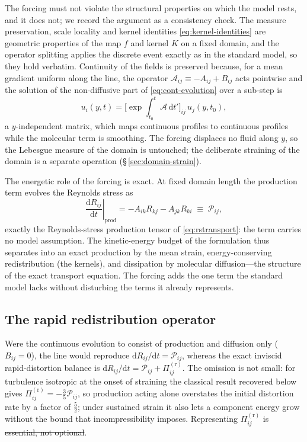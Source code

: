 \documentclass[lineno]{JFM-FLM_Au}
\newcounter{assumption}
\providecommand{\DIFadd}[1]{{\protect\color{blue}\uwave{#1}}} %
\providecommand{\DIFdel}[1]{{\protect\color{red}\sout{#1}}} %
\providecommand{\DIFaddbegin}{} %
\providecommand{\DIFaddend}{} %
\providecommand{\DIFdelbegin}{} %
\providecommand{\DIFdelend}{} %
\begin{document}
The forcing must not violate the structural properties on which the
model rests, and it does not; we record the argument as a consistency
check. The measure preservation, scale locality and kernel identities
\eqref{eq:kernel-identities} are geometric properties of the map $f$ and
kernel $K$ on a fixed domain, and the operator splitting applies the
discrete event exactly as in the standard model, so they hold verbatim.
Continuity of the fields is preserved because, for a mean gradient
uniform along the line, the operator
$\mathcal{A}_{ij}\equiv-A_{ij}+B_{ij}$ acts pointwise and the solution of
the non-diffusive part of \eqref{eq:cont-evolution} over a sub-step is
\begin{equation}
  u_i(y,t)=\big[\exp\!\textstyle\int_{t_0}^{t}
           \mathcal{A}\,\mathrm{d}t'\big]_{ij}\,u_j(y,t_0),
  \label{eq:matrixexp}
\end{equation}
a $y$-independent matrix, which maps continuous profiles to continuous
profiles while the molecular term is smoothing. The forcing displaces no
fluid along $y$, so the Lebesgue measure of the domain is untouched; the
deliberate straining of the domain is a separate operation
(\S\,\ref{sec:domain-strain}).

The energetic role of the forcing is exact. At fixed domain length the
production term evolves the Reynolds stress as
\begin{equation}
  \left.\frac{\mathrm{d}R_{ij}}{\mathrm{d}t}\right|_{\text{prod}}
  = -A_{ik}R_{kj}-A_{jk}R_{ki}
  \;\equiv\; \mathcal{P}_{ij},
  \label{eq:production-rate}
\end{equation}
exactly the Reynolds-stress production tensor of \eqref{eq:rstransport}:
the term carries no model assumption. The kinetic-energy budget of the
formulation thus separates into an exact production by the mean strain,
energy-conserving redistribution (the kernels), and dissipation by
molecular diffusion---the structure of the exact transport equation. The
forcing adds the one term the standard model lacks without disturbing the
terms it already represents.

\subsection{The rapid redistribution operator}\label{sec:rapid-kernel}

Were the continuous evolution to consist of production and diffusion only
($B_{ij}=0$), the line would reproduce
$\mathrm{d}R_{ij}/\mathrm{d}t=\mathcal{P}_{ij}$, whereas the exact
inviscid rapid-distortion balance is
$\mathrm{d}R_{ij}/\mathrm{d}t=\mathcal{P}_{ij}+\Pi^{(\mathrm r)}_{ij}$.
The omission is not small: for turbulence isotropic at the onset of
straining the classical result recovered below gives
$\Pi^{(\mathrm r)}_{ij}=-\tfrac35\mathcal{P}_{ij}$, so production acting
alone overstates the initial distortion rate by a factor of $\tfrac52$;
under sustained strain it also lets a component energy grow without the
bound that incompressibility imposes. Representing
$\Pi^{(\mathrm r)}_{ij}$ is \DIFdelbegin \DIFdel{essential, not optional}\DIFdelend \DIFaddbegin \DIFadd{necessary}\DIFaddend .
\end{document}
